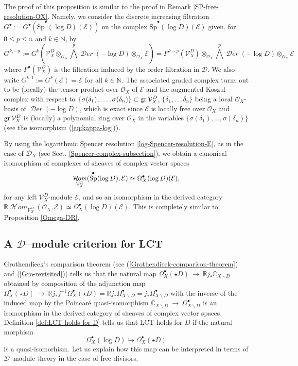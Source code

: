 \documentclass[12pt]{article}
\newcommand{\CC}{\mathbb{C}}
\newcommand{\RR}{\mathbb{R}}
\newcommand{\NN}{\mathbb{N}}
\DeclareMathOperator{\gr}{\rm gr}
\DeclareMathOperator{\fDer}{\mathcal{D}\mathit{er}}
\DeclareMathOperator{\fHom}{\mathcal{H}\!\mathit{om}}
\newcommand{\OO}{\mathcal{O}}
\newcommand{\DD}{\mathcal{D}}
\newcommand{\VV}{\mathcal{V}}
\newcommand{\calE}{\mathcal{E}}
\DeclareMathOperator{\SP}{\rm Sp}
\newcommand{\Sp}{{\mathrm{Sp}}}
\newcommand{\cO}{\OO}
\newcommand\ssm{\smallsetminus}
\newcommand\tos{{\ \rightarrow\ }}
\begin{document}
The proof of this proposition is similar to the proof in Remark \ref{SP-free-resolution-OX}. Namely, we consider the discrete increasing filtration
$G^\bullet:=G^\bullet\left(\widetilde{\Sp}^\bullet(\log D)(\calE)\right)$ on the complex $\widetilde{\Sp}^\bullet(\log D)(\calE)$ given, for $0 \leq p \leq n$ and $k\in \NN$, by
$$G^{k,-p}:=G^k\left(\VV_X^D  \otimes_{\cO_X} \bigwedge^p \fDer(-\log D) \otimes_{\cO_X} \calE\right) = F^{k-p}(\VV_X^D ) \otimes _{\cO_X} \bigwedge^p \fDer(-\log D) \otimes_{\cO_X} \calE$$  where $F^\bullet(\VV_X^D )$ is the filtration induced by the order filtration in $\DD$. We also write $G^{k,1}:=G^k(\calE)= \calE$ for all $k\in \NN$.
The associated graded complex turns out to be (locally) the tensor product over $\cO_X$ of
$\calE$ and the augmented Koszul complex with respect to
$\{\sigma(\delta_1),\dots,\sigma(\delta_n)\} \subset \gr \VV_X^D$, $\{\delta_1,\dots,\delta_n\}$ being a local $\cO_X$-basis of $\fDer(-\log D)$,
which is exact since $\calE$ is locally free over $\cO_X$ and $\gr \VV_X^D$ is (locally) a polynomial ring over $\cO_X$ in the variables $\{\sigma(\delta_1),\dots,\sigma(\delta_n)\}$ (see the isomorphism (\ref{eq:kappa-log})).
\medskip

By using the logarithmic Spencer resolution \ref{log-Spencer-resolution-E}, as in the case of $\DD_X$ (see Sect. \ref{Spencer-complex-subsection}), we obtain a canonical isomorphism of complexes of sheaves of complex vector spaces
$$
\fHom_{\VV_X^D}(\SP^\bullet(\log D),\calE) \simeq \Omega^\bullet_X(\log D)(\calE),
$$
for any left $\VV_X^D$-module $\calE$,
and so an isomorphism in the derived category $\RR\fHom_{\VV_X^D}(\OO_X,\calE) \simeq \Omega^\bullet_X(\log D)(\calE)$. This is completely similar to Proposition \ref{Omega-DR}.

\subsection{A $\DD$--module criterion for LCT\index{$\DD$--module criterion for LCT}}\label{D-module-criterion-for-LCT}

Grothendieck's comparison theorem (see (\ref{Grothendieck-comparison-theorem}) and (\ref{Gro-revisited})) tells us that the natural map $\Omega^\bullet_X(\star D) \tos \RR j_* \CC_{X\ssm D} $ obtained by composition of the adjunction map $\Omega^\bullet_X(\star D) \tos \RR j_* j^{-1} \Omega^\bullet_X(\star D) = \RR j_*\Omega^\bullet_{X\ssm D} = j_*\Omega^\bullet_{X\ssm D}$ with the inverse of the induced map by the Poincar\'e quasi-isomorphism $\CC_{X\ssm D} \tos \Omega^\bullet_{X\ssm D}$ is an isomorphism in the derived category of sheaves of complex vector spaces.
Definition \ref{def:LCT-holds-for-D} tells us that LCT holds for $D$ if the natural morphism
\begin{equation} \label{eq:log-compar}
\Omega^\bullet_X(\log D) \hookrightarrow \Omega^\bullet_X(\star D)
\end{equation}
is a quasi-isomorhism. Let us explain how this map
can be interpreted in terms of $\DD$--module theory in the case of free divisors.
\end{document}
